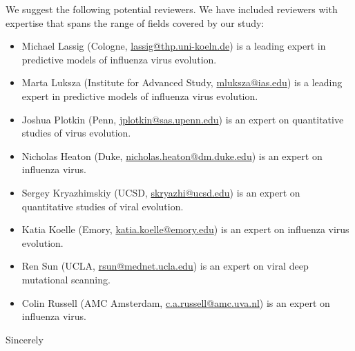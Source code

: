 \documentclass[a4paper,11pt]{letter}
\begin{document}
\begin{letter}{}
We suggest the following potential reviewers.
We have included reviewers with expertise that spans the range of fields covered by our study:
\begin{itemize}
\item Michael Lassig (Cologne, \href{mailto:lassig@thp.uni-koeln.de}{lassig@thp.uni-koeln.de}) is a leading expert in predictive models of influenza virus evolution.
\item Marta Luksza (Institute for Advanced Study, \href{mailto:mluksza@ias.edu}{mluksza@ias.edu}) is a leading expert in predictive models of influenza virus evolution.
\item Joshua Plotkin (Penn, \href{mailto:jplotkin@sas.upenn.edu}{jplotkin@sas.upenn.edu}) is an expert on quantitative studies of virus evolution.
\item Nicholas Heaton (Duke, \href{mailto:nicholas.heaton@dm.duke.edu}{nicholas.heaton@dm.duke.edu}) is an expert on influenza virus.
\item Sergey Kryazhimskiy (UCSD, \href{mailto:skryazhi@ucsd.edu}{skryazhi@ucsd.edu}) is an expert on quantitative studies of viral evolution.
\item Katia Koelle (Emory, \href{mailto:katia.koelle@emory.edu}{katia.koelle@emory.edu}) is an expert on influenza virus evolution.
\item Ren Sun (UCLA, \href{mailto:rsun@mednet.ucla.edu}{rsun@mednet.ucla.edu}) is an expert on viral deep mutational scanning.
\item Colin Russell (AMC Amsterdam, \href{mailto:c.a.russell@amc.uva.nl}{c.a.russell@amc.uva.nl}) is an expert on influenza virus.
\end{itemize}

\closing{Sincerely} %

\end{letter}
\end{document}
